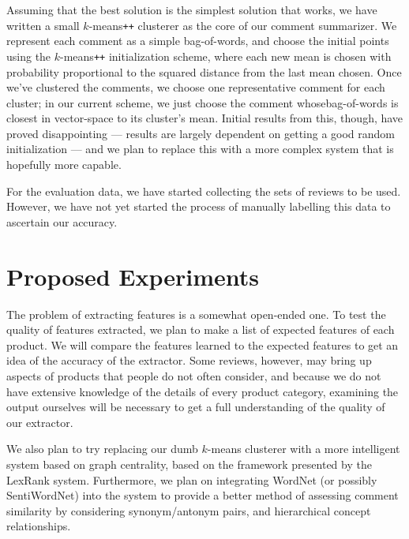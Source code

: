 \documentclass{article}
\begin{document}
Assuming that the best solution is the simplest solution that works, we have
written a small $k$-means\texttt{++} clusterer as the core of our comment 
summarizer.  We represent each comment as a simple bag-of-words, and choose the 
initial points using the $k$-means\texttt{++} initialization scheme, where each 
new mean is chosen with probability proportional to the squared distance from 
the last mean chosen.  Once we've clustered the comments, we choose one 
representative comment for each cluster; in our current scheme, we just choose 
the comment whosebag-of-words is closest in vector-space to its cluster's mean.
Initial results from this, though, have proved disappointing --- results are 
largely dependent on getting a good random initialization --- and we plan to 
replace this with a more complex system that is hopefully more capable.

For the evaluation data, we have started collecting the sets of reviews to be
used.  However, we have not yet started the process of manually labelling this
data to ascertain our accuracy.

\section{Proposed Experiments}
The problem of extracting features is a somewhat open-ended one.  To test the 
quality of features extracted, we plan to make a list of expected features of 
each product.  We will compare the features learned to the expected features to 
get an idea of the accuracy of the extractor.  Some reviews, however, may bring 
up aspects of products that people do not often consider, and because we do not 
have extensive knowledge of the details of every product category, examining 
the output ourselves will be necessary to get a full understanding of the 
quality of our extractor.

We also plan to try replacing our dumb $k$-means clusterer with a more
intelligent system based on graph centrality, based on the framework presented
by the LexRank system. Furthermore, we plan on integrating WordNet (or possibly
SentiWordNet) into the system to provide a better method of assessing comment
similarity by considering synonym/antonym pairs, and hierarchical concept
relationships.

\tocsection


\end{document}
